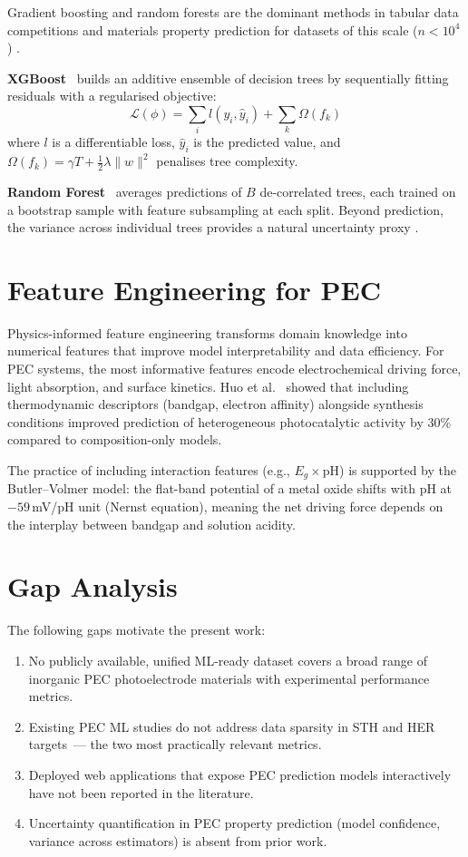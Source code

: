 Gradient boosting and random forests are the dominant methods in tabular
data competitions and materials property prediction for datasets of this
scale ($n < 10^4$) \cite{grinsztajn2022tree}.

\textbf{XGBoost}~\cite{chen2016xgboost} builds an additive ensemble of decision
trees by sequentially fitting residuals with a regularised objective:
\begin{equation}
  \mathcal{L}(\phi) = \sum_i l(y_i, \hat{y}_i) + \sum_k \Omega(f_k)
\end{equation}
where $l$ is a differentiable loss, $\hat{y}_i$ is the predicted value,
and $\Omega(f_k) = \gamma T + \frac{1}{2}\lambda \|w\|^2$ penalises tree
complexity.

\textbf{Random Forest}~\cite{breiman2001random} averages predictions of $B$
de-correlated trees, each trained on a bootstrap sample with feature
subsampling at each split.
Beyond prediction, the variance across individual trees provides a natural
uncertainty proxy \cite{wager2014confidence}.

\section{Feature Engineering for PEC}

Physics-informed feature engineering transforms domain knowledge into
numerical features that improve model interpretability and data efficiency.
For PEC systems, the most informative features encode electrochemical
driving force, light absorption, and surface kinetics.
Huo et al.~\cite{huo2019unified} showed that including thermodynamic
descriptors (bandgap, electron affinity) alongside synthesis conditions
improved prediction of heterogeneous photocatalytic activity by 30\%
compared to composition-only models.

The practice of including interaction features (e.g., $E_g \times \text{pH}$)
is supported by the Butler--Volmer model:
the flat-band potential of a metal oxide shifts with pH at $-59$\,mV/pH unit
(Nernst equation), meaning the net driving force depends on the
interplay between bandgap and solution acidity.

\section{Gap Analysis}

The following gaps motivate the present work:
\begin{enumerate}
  \item No publicly available, unified ML-ready dataset covers a broad
        range of inorganic PEC photoelectrode materials with experimental
        performance metrics.
  \item Existing PEC ML studies do not address data sparsity in STH and HER
        targets~— the two most practically relevant metrics.
  \item Deployed web applications that expose PEC prediction models
        interactively have not been reported in the literature.
  \item Uncertainty quantification in PEC property prediction (model
        confidence, variance across estimators) is absent from prior work.
\end{enumerate}
